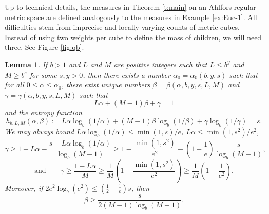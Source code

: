 \documentclass[12pt]{amsart}
\newtheorem{lemma}[theorem]{Lemma}
\theoremstyle{definition}
\theoremstyle{remark}
\numberwithin{figure}{section}
\numberwithin{equation}{section}
\begin{document}
Up to technical details, the measures in Theorem \ref{t:main} on an Ahlfors regular metric space are defined analogously to the measures in Example \ref{ex:Euc-1}. All difficulties stem from imprecise and locally varying counts of metric cubes. Instead of using two weights per cube to define the mass of children, we will need three. See Figure \ref{fig:qb}.

\begin{lemma}\label{entropy-2} If $b>1$ and $L$ and $M$ are positive integers such that $L\leq b^y$ and $M\geq b^s$ for some $s,y>0$, then there exists a number $\alpha_0=\alpha_0(b,y,s)$ such that for all $0\leq \alpha\leq \alpha_0$, there exist unique numbers $\beta=\beta(\alpha,b,y,s,L,M)$ and $\gamma=\gamma(\alpha,b,y,s,L,M)$ such that \begin{equation}\label{abc-1} L\alpha+(M-1)\beta+\gamma=1\end{equation} and the entropy function
\begin{equation}\label{abc-2}
h_{b,L,M}(\alpha,\beta):=L\alpha\log_b(1/\alpha) +(M-1)\beta\log_b(1/\beta)+\gamma\log_b(1/\gamma)=s.\end{equation} We may always bound $L\alpha\log_b(1/\alpha)\leq \min(1,s)/e$, $L\alpha\leq \min(1,s^2)/e^2$,\begin{equation}\label{gamma-bound} \gamma\geq 1-L\alpha-\frac{s-L\alpha\log_b(1/\alpha)}{\log_b(M-1)} \geq 1-\frac{\min(1,s^2)}{e^2}-\left(1-\frac{1}{e}\right)\frac{s}{\log_b(M-1)},\end{equation} \begin{equation}\label{gamma-bound-2} \text{and}\qquad \gamma\geq \frac{1-L\alpha}{M}\geq \frac{1}{M}\left(1-\frac{\min(1,s^2)}{e^2}\right)\geq \frac{1}{M}\left(1-\frac{1}{e^2}\right).\end{equation} Moreover, if $2e^2\log_b(e^2)\leq (\tfrac{1}{2}-\tfrac{1}{e})s$, then \begin{equation}\label{beta-bound} \beta\geq \frac{s}{2(M-1)\log_b(M-1)}.\end{equation}\end{lemma}
\end{document}
